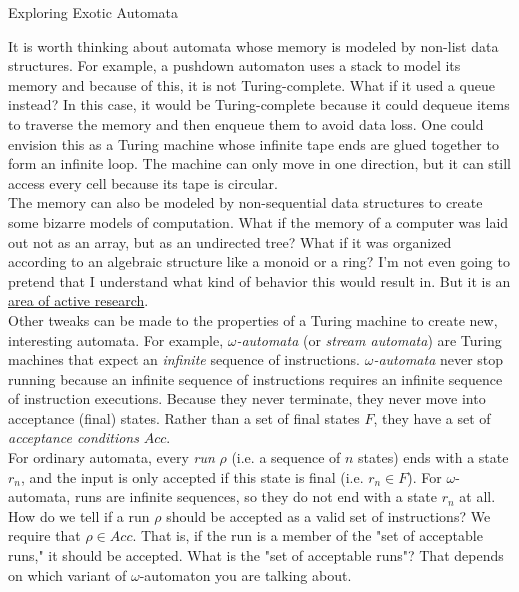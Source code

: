 \begin{bluebox}{Exploring Exotic Automata}

    It is worth thinking about automata whose memory is modeled by non-list data structures. For example, a pushdown automaton uses a stack to model its memory and because of this, it is not Turing-complete. What if it used a queue instead? In this case, it would be Turing-complete because it could dequeue items to traverse the memory and then enqueue them to avoid data loss. One could envision this as a Turing machine whose infinite tape ends are glued together to form an infinite loop. The machine can only move in one direction, but it can still access every cell because its tape is circular. \\
        
    The memory can also be modeled by non-sequential data structures to create some bizarre models of computation. What if the memory of a computer was laid out not as an array, but as an undirected tree? What if it was organized according to an algebraic structure like a monoid or a ring? I'm not even going to pretend that I understand what kind of behavior this would result in. But it is an \underline{area of active research}. \\


    Other tweaks can be made to the properties of a Turing machine to create new, interesting automata. For example, \textit{$\omega$-automata} (or \textit{stream automata}) are Turing machines that expect an \textit{infinite} sequence of instructions. \textit{$\omega$-automata} never stop running because an infinite sequence of instructions requires an infinite sequence of instruction executions. Because they never terminate, they never move into acceptance (final) states. Rather than a set of final states $F$, they have a set of \textit{acceptance conditions} $Acc$. \\
        
    For ordinary automata, every \textit{run} $\rho$ (i.e. a sequence of $n$ states) ends with a state $r_n$, and the input is only accepted if this state is final (i.e. $r_n\in F$). For $\omega$-automata, runs are infinite sequences, so they do not end with a state $r_n$ at all. How do we tell if a run $\rho$ should be accepted as a valid set of instructions? We require that $\rho\in Acc$. That is, if the run is a member of the "set of acceptable runs," it should be accepted. What is the "set of acceptable runs"? That depends on which variant of $\omega$-automaton you are talking about. \\
        

\end{bluebox}

